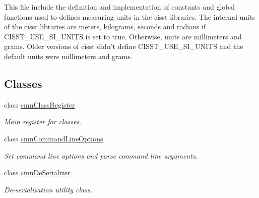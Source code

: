 \begin{DoxyCompactItemize}
\begin{DoxyCompactList}
This file include the definition and implementation of constants and global functions used to defines measuring units in the cisst libraries. The internal units of the cisst libraries are meters, kilograms, seconds and radians if C\-I\-S\-S\-T\-\_\-\-U\-S\-E\-\_\-\-S\-I\-\_\-\-U\-N\-I\-T\-S is set to true. Otherwise, units are millimeters and grams. Older versions of cisst didn't define C\-I\-S\-S\-T\-\_\-\-U\-S\-E\-\_\-\-S\-I\-\_\-\-U\-N\-I\-T\-S and the default units were millimeters and grams. \end{DoxyCompactList}\end{DoxyCompactItemize}
\subsection*{Classes}
\begin{DoxyCompactItemize}
\item 
class \hyperlink{classcmn_class_register}{cmn\-Class\-Register}
\begin{DoxyCompactList}\small\item\em Main register for classes. \end{DoxyCompactList}\item 
class \hyperlink{classcmn_command_line_options}{cmn\-Command\-Line\-Options}
\begin{DoxyCompactList}\small\item\em Set command line options and parse command line arguments. \end{DoxyCompactList}\item 
class \hyperlink{classcmn_de_serializer}{cmn\-De\-Serializer}
\begin{DoxyCompactList}\small\item\em De-\/serialization utility class.


\end{DoxyCompactList}
\end{DoxyCompactItemize}
